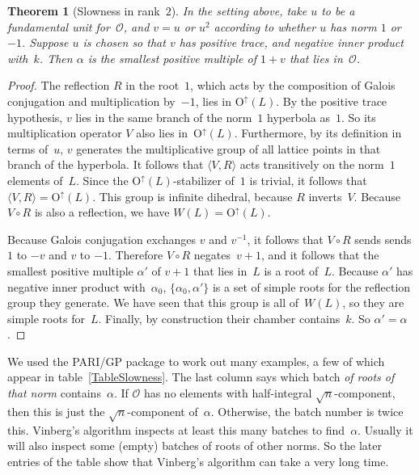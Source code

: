 \documentclass[12pt]{amsart}
\def\gend#1{\langle#1\rangle}
\def\O{\mathrm{O}}
\def\Oup{\O^{\uparrow}}
\def\calO{\mathcal{O}}
\newtheorem{theorem}{Theorem}
\numberwithin{theorem}{section}
\numberwithin{equation}{section}
\numberwithin{figure}{section}
\theoremstyle{remark}
\begin{document}
\begin{theorem}[Slowness in rank~$2$]
    \label{ThmSlowness}
    In the setting above, take $u$ to be a fundamental unit for~$\calO$,
    and $v=u$ or $u^2$ according to whether $u$ has norm $1$ or~$-1$.
    Suppose $u$ is chosen so that $v$ has positive trace, and
    negative inner product with~$k$.
    Then $\alpha$ is the smallest positive multiple of $1+v$ 
    that lies in~$\calO$.
\end{theorem}

\begin{proof}
     The reflection $R$ in the root~$1$, which acts by the
    composition of Galois conjugation and multiplication by~$-1$,
    lies in $\Oup(L)$.
    By the positive trace hypothesis, $v$ lies in the same branch
    of the norm~$1$ hyperbola as~$1$.  So its multiplication
    operator $V$ also lies in~$\Oup(L)$.  Furthermore,
    by its definition in terms of~$u$,
    $v$ generates the multiplicative group of all lattice points in
    that branch of the hyperbola.  It follows that $\gend{V,R}$ 
    acts transitively on the norm~$1$ elements of~$L$. Since the
    $\Oup(L)$-stabilizer of~$1$ is trivial, it follows that
    $\gend{V,R}=\Oup(L)$.
    This group is infinite dihedral, because $R$ inverts~$V$.  
    Because $V\circ R$ is also a reflection, we have  $W(L)=\Oup(L)$.

    Because Galois conjugation exchanges $v$ and $v^{-1}$, it follows that $V\circ R$ sends
    sends $1$ to $-v$ and $v$ to $-1$.  Therefore
    $V\circ R$ negates~$v+1$, and   it follows that the smallest
    positive multiple $\alpha'$ of $v+1$ that lies in~$L$ is a root of~$L$.
Because $\alpha'$ has negative inner product with~$\alpha_0$, $\{\alpha_0,\alpha'\}$
    is a set of simple roots for the reflection group they
    generate.  We have seen that this group is all of~$W(L)$,
    so they are simple roots for~$L$.  Finally, by construction
    their chamber contains~$k$.  So $\alpha'=\alpha$.
\end{proof}

We used the PARI/GP package \cite{PARI} to work out many examples,
a few of which appear in table~\ref{TableSlowness}.  The last column says
which batch \emph{of roots of that norm} contains~$\alpha$.  
If $\calO$ has no elements with half-integral $\sqrt{n}$-component,
then this is just the $\sqrt{n}$-component of~$\alpha$.
Otherwise, the batch number is twice this.  
Vinberg's algorithm inspects at least this many batches to find~$\alpha$.
Usually it will also inspect  some
(empty) batches of roots of other norms.  So the later entries of the
table show that Vinberg's algorithm
can take a very long time.
\end{document}
